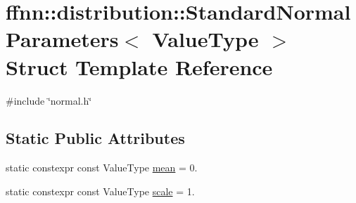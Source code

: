 \hypertarget{structffnn_1_1distribution_1_1_standard_normal_parameters}{\section{ffnn\-:\-:distribution\-:\-:Standard\-Normal\-Parameters$<$ Value\-Type $>$ Struct Template Reference}
\label{structffnn_1_1distribution_1_1_standard_normal_parameters}
}


{\ttfamily \#include \char`\"{}normal.\-h\char`\"{}}

\subsection*{Static Public Attributes}
\begin{DoxyCompactItemize}
\item 
static constexpr const Value\-Type \hyperlink{structffnn_1_1distribution_1_1_standard_normal_parameters_a94d8bae101a2203451f19d19cf4f5ba0}{mean} = 0.
\item 
static constexpr const Value\-Type \hyperlink{structffnn_1_1distribution_1_1_standard_normal_parameters_a67fa6f41f870e9cb7ac71df8ddbe8155}{scale} = 1.
\end{DoxyCompactItemize}


